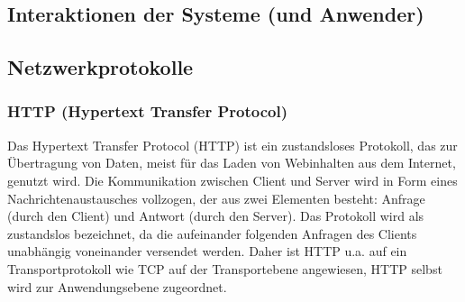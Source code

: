 


\subsection{Interaktionen der Systeme (und Anwender)}



\subsection{Netzwerkprotokolle}

\subsubsection{HTTP (Hypertext Transfer Protocol)}
Das Hypertext Transfer Protocol (HTTP) ist ein zustandsloses Protokoll, das zur Übertragung von Daten, meist für das Laden von Webinhalten aus dem Internet, genutzt wird. Die Kommunikation zwischen Client und Server wird in Form eines Nachrichtenaustausches vollzogen, der aus zwei Elementen besteht: Anfrage (durch den Client) und Antwort (durch den Server). Das Protokoll wird als \glqq zustandslos\grqq{} bezeichnet, da die aufeinander folgenden Anfragen des Clients unabhängig voneinander versendet werden. Daher ist HTTP u.a. auf ein Transportprotokoll wie TCP auf der Transportebene angewiesen, HTTP selbst wird zur Anwendungsebene zugeordnet.\\ 

